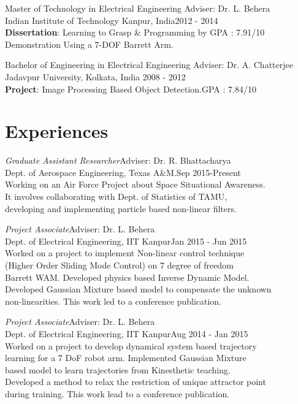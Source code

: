 \documentclass[margin,line]{resume}
\begin{document}
\begin{resume}
    \vspace{-2mm}

	Master of Technology in Electrical Engineering \hfill Adviser: Dr. L. Behera\\
	Indian Institute of Technology Kanpur, India\hfill 2012 - 2014\\
	\textbf{Dissertation}: Learning to Grasp \& Programming by \hfill GPA : 7.91/10 \\Demonstration
	Using a 7-DOF Barrett Arm.

\vspace{-2mm}

	Bachelor of Engineering in Electrical Engineering \hfill Adviser: Dr. A. Chatterjee \\
	Jadavpur University, Kolkata, India \hfill  2008 - 2012 \\
	\textbf{Project}: Image Processing Based Object Detection.\hfill GPA : 7.84/10

\section{\mysidestyle Experiences}

    \emph{Graduate Assistant  Researcher}\hfill Adviser: Dr. R. Bhattacharya\\
    Dept. of Aerospace Engineering, Texas A\&M.\hfill Sep 2015-Present\\
    Working on an Air Force Project about Space Situational Awareness. \\It involves collaborating with Dept. of Statistics of TAMU, \\developing and implementing particle based non-linear filters.

    \emph{Project Associate}\hfill Adviser: Dr. L. Behera\\
    Dept. of Electrical Engineering, IIT Kanpur\hfill Jan 2015 - Jun 2015\\
    Worked on a project to implement Non-linear control technique\\ (Higher Order Sliding Mode Control) on 7 degree of freedom \\Barrett WAM. Developed physics based Inverse Dynamic Model.\\ Developed Gaussian Mixture based model to compensate the unknown \\non-linearities. This work led to a conference publication.

    \emph{Project Associate}\hfill Adviser: Dr. L. Behera\\
    Dept. of Electrical Engineering, IIT Kanpur\hfill Aug 2014 - Jan 2015\\
    Worked on a project to develop dynamical system based trajectory \\learning for a 7 DoF robot arm. Implemented Gaussian Mixture \\based model to learn trajectories from Kinesthetic teaching. \\Developed a method to relax the restriction of unique attractor point \\during training. This work lead to a conference publication.



\end{resume}
\end{document}
